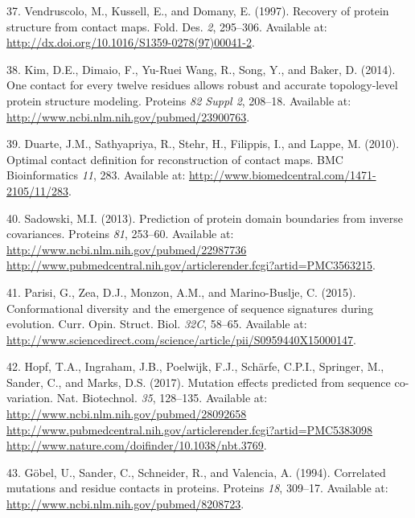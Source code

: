 \documentclass[11pt,a4paper,twoside]{book}
\theoremstyle{definition}
\theoremstyle{definition}
\theoremstyle{remark}
\begin{document}
\hypertarget{ref-Vendruscolo1997}{}
37. Vendruscolo, M., Kussell, E., and Domany, E. (1997). Recovery of
protein structure from contact maps. Fold. Des. \emph{2}, 295--306.
Available at: \url{http://dx.doi.org/10.1016/S1359-0278(97)00041-2}.

\hypertarget{ref-Kim2014}{}
38. Kim, D.E., Dimaio, F., Yu-Ruei Wang, R., Song, Y., and Baker, D.
(2014). One contact for every twelve residues allows robust and accurate
topology-level protein structure modeling. Proteins \emph{82 Suppl 2},
208--18. Available at:
\url{http://www.ncbi.nlm.nih.gov/pubmed/23900763}.

\hypertarget{ref-Duarte2010}{}
39. Duarte, J.M., Sathyapriya, R., Stehr, H., Filippis, I., and Lappe,
M. (2010). Optimal contact definition for reconstruction of contact
maps. BMC Bioinformatics \emph{11}, 283. Available at:
\url{http://www.biomedcentral.com/1471-2105/11/283}.

\hypertarget{ref-Sadowski2013}{}
40. Sadowski, M.I. (2013). Prediction of protein domain boundaries from
inverse covariances. Proteins \emph{81}, 253--60. Available at:
\href{http://www.ncbi.nlm.nih.gov/pubmed/22987736\%20http://www.pubmedcentral.nih.gov/articlerender.fcgi?artid=PMC3563215}{http://www.ncbi.nlm.nih.gov/pubmed/22987736 http://www.pubmedcentral.nih.gov/articlerender.fcgi?artid=PMC3563215}.

\hypertarget{ref-Parisi2015a}{}
41. Parisi, G., Zea, D.J., Monzon, A.M., and Marino-Buslje, C. (2015).
Conformational diversity and the emergence of sequence signatures during
evolution. Curr. Opin. Struct. Biol. \emph{32C}, 58--65. Available at:
\url{http://www.sciencedirect.com/science/article/pii/S0959440X15000147}.

\hypertarget{ref-Hopf2017}{}
42. Hopf, T.A., Ingraham, J.B., Poelwijk, F.J., Schärfe, C.P.I.,
Springer, M., Sander, C., and Marks, D.S. (2017). Mutation effects
predicted from sequence co-variation. Nat. Biotechnol. \emph{35},
128--135. Available at:
\href{http://www.ncbi.nlm.nih.gov/pubmed/28092658\%20http://www.pubmedcentral.nih.gov/articlerender.fcgi?artid=PMC5383098\%20http://www.nature.com/doifinder/10.1038/nbt.3769}{http://www.ncbi.nlm.nih.gov/pubmed/28092658 http://www.pubmedcentral.nih.gov/articlerender.fcgi?artid=PMC5383098 http://www.nature.com/doifinder/10.1038/nbt.3769}.

\hypertarget{ref-Gobel1994}{}
43. Göbel, U., Sander, C., Schneider, R., and Valencia, A. (1994).
Correlated mutations and residue contacts in proteins. Proteins
\emph{18}, 309--17. Available at:
\url{http://www.ncbi.nlm.nih.gov/pubmed/8208723}.
\end{document}

